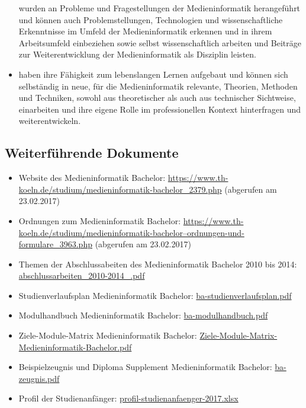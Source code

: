 \begin{itemize}
  wurden an Probleme und Fragestellungen der Medieninformatik
  herangeführt und können auch Problemstellungen, Technologien und
  wissenschaftliche Erkenntnisse im Umfeld der Medieninformatik erkennen
  und in ihrem Arbeitsumfeld einbeziehen sowie selbst wissenschaftlich
  arbeiten und Beiträge zur Weiterentwicklung der Medieninformatik als
  Disziplin leisten.
\item
  haben ihre Fähigkeit zum lebenslangen Lernen aufgebaut und können sich
  selbständig in neue, für die Medieninformatik relevante, Theorien,
  Methoden und Techniken, sowohl aus theoretischer als auch aus
  technischer Sichtweise, einarbeiten und ihre eigene Rolle im
  professionellen Kontext hinterfragen und weiterentwickeln.
\end{itemize}

\subsection{Weiterführende
Dokumente}\label{weiterfuxfchrende-dokumente}

\begin{itemize}
\tightlist
\item
  Website des Medieninformatik Bachelor:
  \url{https://www.th-koeln.de/studium/medieninformatik-bachelor_2379.php}
  (abgerufen am 23.02.2017)
\item
  Ordnungen zum Medieninformatik Bachelor:
  \href{https://www.th-koeln.de/studium/medieninformatik-bachelor--ordnungen-und-formulare_3963.php}{https://www.th-koeln.de/studium/medieninformatik-bachelor--ordnungen-und-formulare\_3963.php}
  (abgerufen am 23.02.2017)
\item
  Themen der Abschlussabeiten des Medieninformatik Bachelor 2010 bis
  2014:
  \href{../anhaenge/abschlussarbeiten_2010-2014_.pdf}{abschlussarbeiten\_2010-2014\_.pdf}
\item
  Studienverlaufsplan Medieninformatik Bachelor:
  \href{../anhaenge/ba-studienverlaufsplan.pdf}{ba-studienverlaufsplan.pdf}
\item
  Modulhandbuch Medieninformatik Bachelor:
  \href{../anhaenge/ba-modulhandbuch.pdf}{ba-modulhandbuch.pdf}
\item
  Ziele-Module-Matrix Medieninformatik Bachelor:
  \href{../anhaenge/Ziele-Module-Matrix-Medieninformatik-Bachelor.pdf}{Ziele-Module-Matrix-Medieninformatik-Bachelor.pdf}
\item
  Beispielzeugnis und Diploma Supplement Medieninformatik Bachelor:
  \href{../anhaenge/ba-zeugnis.pdf}{ba-zeugnis.pdf}
\item
  Profil der Studienanfänger:
  \href{../anhaenge/profil-studienanfaenger-2017.xlsx}{profil-studienanfaenger-2017.xlsx}
\end{itemize}

